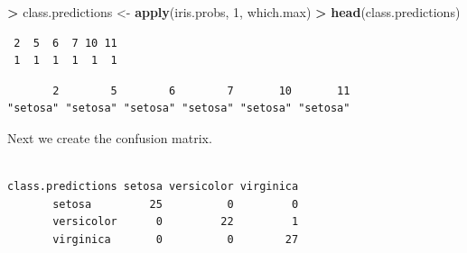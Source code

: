 \documentclass[]{krantz}
\makeatletter
\newenvironment{Shaded}{\begin{snugshade}}{\end{snugshade}}
\newcommand{\DecValTok}[1]{\textcolor[rgb]{0.06,0.06,0.06}{#1}}
\newcommand{\KeywordTok}[1]{\textcolor[rgb]{0.27,0.27,0.27}{\textbf{#1}}}
\newcommand{\NormalTok}[1]{#1}
\newcommand{\OperatorTok}[1]{\textcolor[rgb]{0.43,0.43,0.43}{\textbf{#1}}}
\newcommand{\StringTok}[1]{\textcolor[rgb]{0.5,0.5,0.5}{#1}}
\newenvironment{kframe}{%
\medskip{}
\setlength{\fboxsep}{.8em}
 \def\at@end@of@kframe{}%
 \ifinner\ifhmode%
  \def\at@end@of@kframe{\end{minipage}}%
  \begin{minipage}{\columnwidth}%
 \fi\fi%
 \def\FrameCommand##1{\hskip\@totalleftmargin \hskip-\fboxsep
 \colorbox{shadecolor}{##1}\hskip-\fboxsep
     \hskip-\linewidth \hskip-\@totalleftmargin \hskip\columnwidth}%
 \MakeFramed {\advance\hsize-\width
   \@totalleftmargin\z@ \linewidth\hsize
   \@setminipage}}%
 {\par\unskip\endMakeFramed%
 \at@end@of@kframe}
\renewenvironment{Shaded}{\begin{kframe}}{\end{kframe}}
\makeatother
\begin{document}
\begin{Shaded}
\begin{Highlighting}[]
\OperatorTok{>}\StringTok{ }\NormalTok{class.predictions <-}\StringTok{ }\KeywordTok{apply}\NormalTok{(iris.probs, }\DecValTok{1}\NormalTok{, which.max)}
\OperatorTok{>}\StringTok{ }\KeywordTok{head}\NormalTok{(class.predictions)}
\end{Highlighting}
\end{Shaded}

\begin{verbatim}
 2  5  6  7 10 11 
 1  1  1  1  1  1 
\end{verbatim}

\begin{Shaded}
\end{Shaded}

\begin{verbatim}
       2        5        6        7       10       11 
"setosa" "setosa" "setosa" "setosa" "setosa" "setosa" 
\end{verbatim}

Next we create the confusion matrix.

\begin{Shaded}
\end{Shaded}

\begin{verbatim}
                 
class.predictions setosa versicolor virginica
       setosa         25          0         0
       versicolor      0         22         1
       virginica       0          0        27
\end{verbatim}
\end{document}
